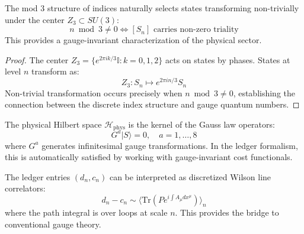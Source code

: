 \begin{theorem}
The mod 3 structure of indices naturally selects states transforming non-trivially under the center $Z_3 \subset SU(3)$:
\begin{equation}
n \bmod 3 \neq 0 \iff [S_n] \text{ carries non-zero triality}
\end{equation}
This provides a gauge-invariant characterization of the physical sector.
\end{theorem}

\begin{proof}
The center $Z_3 = \{e^{2\pi i k/3} \mathbb{I} : k = 0,1,2\}$ acts on states by phases. States at level $n$ transform as:
\begin{equation}
Z_3: S_n \mapsto e^{2\pi i n/3} S_n
\end{equation}
Non-trivial transformation occurs precisely when $n \bmod 3 \neq 0$, establishing the connection between the discrete index structure and gauge quantum numbers.
\end{proof}

\begin{remark}
The physical Hilbert space $\mathcal{H}_{\text{phys}}$ is the kernel of the Gauss law operators:
\begin{equation}
G^a |S\rangle = 0, \quad a = 1,\ldots,8
\end{equation}
where $G^a$ generates infinitesimal gauge transformations. In the ledger formalism, this is automatically satisfied by working with gauge-invariant cost functionals.
\end{remark}

\begin{proposition}
The ledger entries $(d_n, c_n)$ can be interpreted as discretized Wilson line correlators:
\begin{equation}
d_n - c_n \sim \langle \text{Tr}(P e^{i\int A_\mu dx^\mu}) \rangle_n
\end{equation}
where the path integral is over loops at scale $n$. This provides the bridge to conventional gauge theory.
\end{proposition} 